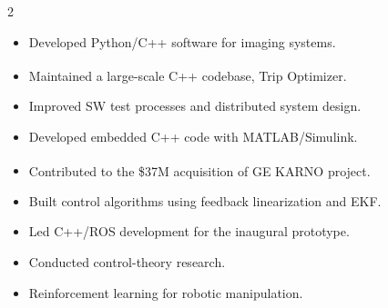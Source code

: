 \documentclass[10pt,a4paper,ragged2e,withhyper]{altacv}
\begin{document}
\begin{paracol}{2}

    \begin{itemize}
        \item Developed Python/C++ software for imaging systems.
    \end{itemize}

    \divider

    \begin{itemize}
        \item Maintained a large-scale C++ codebase, Trip Optimizer\textsuperscript{\textregistered}.
        \item Improved SW test processes and distributed system design.
    \end{itemize}

    \divider

    \begin{itemize}
        \item Developed embedded C++ code with MATLAB/Simulink.
        \item Contributed to the \$37M acquisition of GE KARNO\textsuperscript{\textregistered} project.
    \end{itemize}

    \divider

    \begin{itemize}
        \item Built control algorithms using feedback linearization and EKF.
        \item Led C++/ROS development for the inaugural prototype.
    \end{itemize}

    \divider

    \begin{itemize}
        \item Conducted control-theory research.
        \item Reinforcement learning for robotic manipulation.
    \end{itemize}


\end{paracol}
\end{document}
